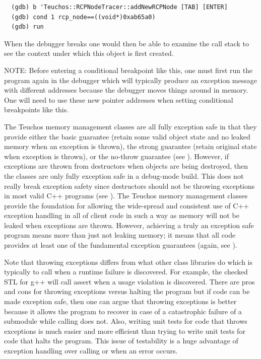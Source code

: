 \documentclass[pdf,ps2pdf,11pt]{SANDreport}
\begin{document}
{\small\begin{verbatim}
  (gdb) b 'Teuchos::RCPNodeTracer::addNewRCPNode [TAB] [ENTER]
  (gdb) cond 1 rcp_node==((void*)0xab65a0)
  (gdb) run
\end{verbatim}}

When the debugger breaks one would then be able to examine the call
stack to see the context under which this {} object is
first created.

NOTE: Before entering a conditional breakpoint like this, one must
first run the program again in the debugger which will typically
produce an exception message with different addresses because the
debugger moves things around in memory.  One will need to use these
new pointer addresses when setting conditional breakpoints like this.

The Teuchos memory management classes are all fully exception safe in
that they provide either the basic guarantee (retain some valid object
state and no leaked memory when an exception is thrown), the strong
guarantee (retain original state when exception is thrown), or the
no-throw guarantee (see {}\cite[Item 71]{C++CodingStandards05}).
However, if exceptions are thrown from destructors when objects are
being destroyed, then the classes are only fully exception safe in a
debug-mode build.  This does not really break exception safety since
destructors should not be throwing exceptions in most valid C++
programs (see {}\cite[Item 51]{C++CodingStandards05}).  The Teuchos
memory management classes provide the foundation for allowing the
wide-spread and consistent use of C++ exception handling in all of
client code in such a way as memory will not be leaked when exceptions
are thrown.  However, achieving a truly an exception safe program
means more than just not leaking memory; it means that all code
provides at least one of the fundamental exception guarantees (again,
see {}\cite[Item 71]{C++CodingStandards05}).

Note that throwing exceptions differs from what other class libraries
do which is typically to call {} when a runtime
failure is discovered.  For example, the checked STL for g++ will call
assert when a usage violation is discovered.  There are pros and cons
for throwing exceptions versus halting the program but if code can be
made exception safe, then one can argue that throwing exceptions is
better because it allows the program to recover in case of a
catastrophic failure of a submodule while calling {} 
does not.  Also, writing unit tests for code that throws exceptions is
much easier and more efficient than trying to write unit tests for
code that halts the program.  This issue of testability is a huge
advantage of exception handling over calling {} or
{} when an error occurs.
\end{document}
